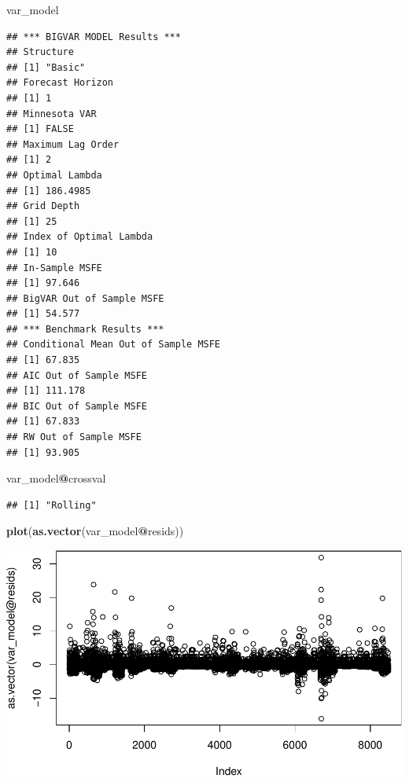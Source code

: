 \documentclass[]{article}
\newenvironment{Shaded}{\begin{snugshade}}{\end{snugshade}}
\newcommand{\KeywordTok}[1]{\textcolor[rgb]{0.13,0.29,0.53}{\textbf{#1}}}
\newcommand{\NormalTok}[1]{#1}
\newcommand{\OperatorTok}[1]{\textcolor[rgb]{0.81,0.36,0.00}{\textbf{#1}}}
\begin{document}
\begin{Shaded}
\begin{Highlighting}[]
\NormalTok{var_model}
\end{Highlighting}
\end{Shaded}

\begin{verbatim}
## *** BIGVAR MODEL Results *** 
## Structure
## [1] "Basic"
## Forecast Horizon 
## [1] 1
## Minnesota VAR
## [1] FALSE
## Maximum Lag Order 
## [1] 2
## Optimal Lambda 
## [1] 186.4985
## Grid Depth 
## [1] 25
## Index of Optimal Lambda 
## [1] 10
## In-Sample MSFE
## [1] 97.646
## BigVAR Out of Sample MSFE
## [1] 54.577
## *** Benchmark Results *** 
## Conditional Mean Out of Sample MSFE
## [1] 67.835
## AIC Out of Sample MSFE
## [1] 111.178
## BIC Out of Sample MSFE
## [1] 67.833
## RW Out of Sample MSFE
## [1] 93.905
\end{verbatim}

\begin{Shaded}
\begin{Highlighting}[]
\NormalTok{var_model}\OperatorTok{@}\NormalTok{crossval}
\end{Highlighting}
\end{Shaded}

\begin{verbatim}
## [1] "Rolling"
\end{verbatim}

\begin{Shaded}
\begin{Highlighting}[]
\KeywordTok{plot}\NormalTok{(}\KeywordTok{as.vector}\NormalTok{(var_model}\OperatorTok{@}\NormalTok{resids))}
\end{Highlighting}
\end{Shaded}

\includegraphics{VAR_files/figure-latex/unnamed-chunk-8-1.pdf}
\end{document}
